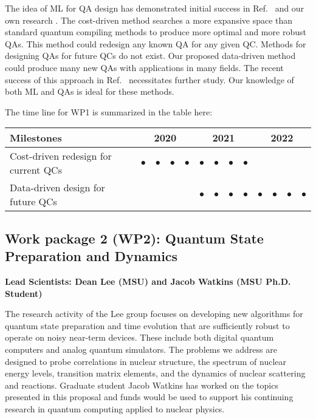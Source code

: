 \documentclass[11pt]{article}
\begin{document}
The idea of ML for QA design has demonstrated initial success in Ref.~\cite{Mitarai2018,Cincio2018} and our own research \cite{Khatri2018}. The cost-driven method searches a more expansive space than standard quantum compiling methods to produce more optimal and more robust QAs. This method could redesign any known QA for any given QC.
Methods for designing QAs for future QCs do not exist. Our proposed data-driven method could produce many new QAs with applications in many fields. The recent success of this approach in Ref.~\cite{Cincio2018} necessitates further study. Our knowledge of both ML and QAs is ideal for these methods.


The time line for WP1 is summarized in the table here:
\begin{footnotesize}
\begin{center}
\begin{tabular}{|l|c|c|c|c|c|c|c|c|c|c|c|c|}
\hline
\multicolumn{1}{|l}{Milestones } & \multicolumn{4}{|c|}{ 2020 } & \multicolumn{4}{c|}{ 2021 } & \multicolumn{4}{c|}{ 2022 } \\
\hline
Cost-driven redesign for current QCs &$\bullet$ &$\bullet$ &$\bullet$ &$\bullet$ & $\bullet$ & $\bullet$&$\bullet$ &$\bullet$ & & & & \\
\hline
Data-driven design for future QCs & & & & & $\bullet$ & $\bullet$ & $\bullet$ & $\bullet$ & $\bullet$ &$\bullet$ &$\bullet$ &$\bullet$ \\
\hline
\end{tabular}
\end{center}
\end{footnotesize}



\subsection{Work package 2 (WP2): Quantum State Preparation and Dynamics}
{\bf Lead Scientists: Dean Lee (MSU) and Jacob Watkins (MSU Ph.D. Student)}

The research activity of the Lee group focuses on developing new algorithms for quantum state preparation and time evolution that are sufficiently robust to operate on noisy near-term devices.  These include both digital quantum computers and analog quantum simulators.  The problems we address are designed to probe correlations in nuclear structure, the spectrum of nuclear energy levels, transition matrix elements, and the dynamics of nuclear scattering and reactions.  Graduate  student Jacob Watkins has worked on the topics presented in this proposal and funds would be used to support his continuing research in quantum computing applied to nuclear physics. 
\end{document}
